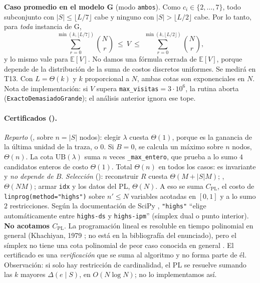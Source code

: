 \noindent\textbf{Caso promedio en el modelo G} (modo \texttt{ambos}). Como $c_i\in\{2,\dots,7\}$, todo subconjunto con $|S|\le\lfloor L/7\rfloor$ cabe y ninguno con $|S|>\lfloor L/2\rfloor$ cabe. Por lo tanto, para \emph{toda} instancia de G,
\[
\sum_{r=0}^{\min(k,\lfloor L/7\rfloor)}\binom Nr\ \le\ V\ \le\ \sum_{r=0}^{\min(k,\lfloor L/2\rfloor)}\binom Nr ,
\]
y lo mismo vale para $\mathbb E[V]$. No damos una fórmula cerrada de $\mathbb E[V]$, porque depende de la distribución de la suma de costos discretos uniformes. Se medirá en T13. Con $L=\Theta(k)$ y $k$ proporcional a $N$, ambas cotas son exponenciales en $N$. Nota de implementación: si $V$ supera \texttt{max\_visitas}$=3\cdot10^6$, la rutina aborta (\texttt{ExactoDemasiadoGrande}); el análisis anterior ignora ese tope.

\paragraph{Certificados ().}
\emph{Reparto} (, sobre $n=|S|$ nodos): elegir $\lambda$ cuesta $\Theta(1)$, porque es la ganancia de la última unidad de la traza, o $0$. Si $B=0$, se calcula un máximo sobre $n$ nodos, $\Theta(n)$. La cota $\mathrm{UB}(\lambda)$ suma $n$ veces \texttt{\_max\_entero}, que prueba a lo sumo $4$ candidatos enteros de costo $\Theta(1)$. Total $\Theta(n)$ en todos los casos: es invariante y \emph{no depende de $B$}.
\emph{Selección} (): reconstruir $R$ cuesta $\Theta(M+|S|M)$; , $\Theta(NM)$; armar \texttt{idx} y los datos del PL, $\Theta(N)$. A eso se suma $C_{\text{PL}}$, el costo de \texttt{linprog(method="highs")} sobre $n'\le N$ variables acotadas en $[0,1]$ y a lo sumo $2$ restricciones. Según la documentación de SciPy \cite{scipy_linprog}, \texttt{"highs"} ``elige automáticamente entre \texttt{highs-ds} y \texttt{highs-ipm}'' (símplex dual o punto interior). \textbf{No acotamos $C_{\text{PL}}$}. La programación lineal es resoluble en tiempo polinomial en general (Khachiyan, 1979 \cite{khachiyan1979}; no está en la bibliografía del enunciado), pero el símplex no tiene una cota polinomial de peor caso conocida en general \VER{}. El certificado es una \emph{verificación} que se suma al algoritmo y no forma parte de él. Observación: si solo hay restricción de cardinalidad, el PL se resuelve sumando las $k$ mayores $\Delta(e\mid S)$, en $O(N\log N)$; no lo implementamos así.

